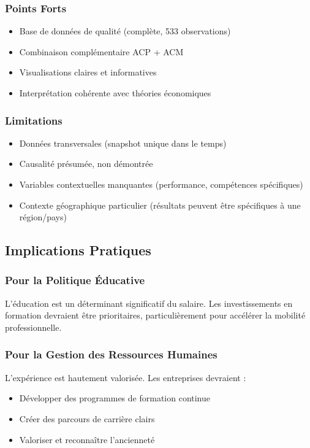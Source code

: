 \documentclass[12pt,a4paper]{report}
\begin{document}
\subsubsection{Points Forts}

\begin{itemize}
    \item Base de données de qualité (complète, 533 observations)
    \item Combinaison complémentaire ACP + ACM
    \item Visualisations claires et informatives
    \item Interprétation cohérente avec théories économiques
\end{itemize}

\subsubsection{Limitations}

\begin{itemize}
    \item Données transversales (snapshot unique dans le temps)
    \item Causalité présumée, non démontrée
    \item Variables contextuelles manquantes (performance, compétences spécifiques)
    \item Contexte géographique particulier (résultats peuvent être spécifiques à une région/pays)
\end{itemize}

\subsection{Implications Pratiques}

\subsubsection{Pour la Politique Éducative}

L'éducation est un déterminant significatif du salaire. Les investissements en formation devraient être prioritaires, particulièrement pour accélérer la mobilité professionnelle.

\subsubsection{Pour la Gestion des Ressources Humaines}

L'expérience est hautement valorisée. Les entreprises devraient :
\begin{itemize}
    \item Développer des programmes de formation continue
    \item Créer des parcours de carrière clairs
    \item Valoriser et reconnaître l'ancienneté
\end{itemize}
\end{document}
